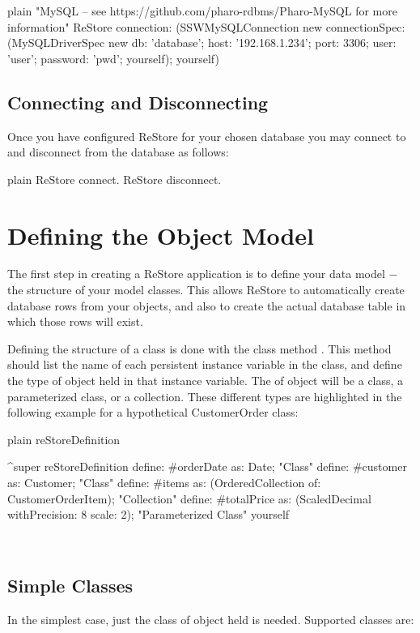 \documentclass[10pt,twoside,english]{_support/latex/sbabook/sbabook}
\begin{document}
\begin{displaycode}{plain}
"MySQL – see https://github.com/pharo-rdbms/Pharo-MySQL for more information"
ReStore connection: 
(SSWMySQLConnection new 
	connectionSpec: 
		(MySQLDriverSpec new 
			db: 'database'; host: '192.168.1.234'; port: 3306; 
			user: 'user'; password: 'pwd'; 
		yourself); 
yourself)
\end{displaycode}
\section{Connecting and Disconnecting}
Once you have configured ReStore for your chosen database you may connect to and disconnect from the database as follows:

\begin{displaycode}{plain}
ReStore connect.
ReStore disconnect.
\end{displaycode}

\chapter{Defining the Object Model}
The first step in creating a ReStore application is to define your data model − the structure of your model classes. This allows ReStore to automatically create database rows from your objects, and also to create the actual database table in which those rows will exist. 

Defining the structure of a class is done with the class method . This method should list the name of each persistent instance variable in the class, and define the type of object held in that instance variable. The  of object will be a class, a parameterized class, or a collection. These different types are highlighted in the following example for a hypothetical CustomerOrder class: 
  

\begin{displaycode}{plain}
reStoreDefinition 

	^super reStoreDefinition
		define: #orderDate as: Date; 	"Class"
		define: #customer as: Customer;	"Class"
		define: #items as: (OrderedCollection of: CustomerOrderItem);	"Collection"
		define: #totalPrice as: (ScaledDecimal withPrecision: 8 scale: 2); 	"Parameterized Class"
		yourself
\end{displaycode}

 
\section{Simple Classes}
In the simplest case, just the class of object held is needed. Supported classes are: 
\end{document}

